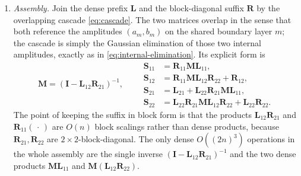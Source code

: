 \documentclass[11pt]{article}
\theoremstyle{remark}
\newcommand{\Id}{\mathbf{I}}
\begin{document}
\begin{enumerate}
\item \emph{Assembly.} Join the dense prefix $\mathbf{L}$ and the
  block-diagonal suffix $\mathbf{R}$ by the overlapping cascade
  \eqref{eq:cascade}.  The two matrices overlap in the sense that both
  reference the amplitudes $(a_m,b_m)$ on the shared boundary layer $m$;
  the cascade is simply the Gaussian elimination of those two internal
  amplitudes, exactly as in \eqref{eq:internal-elimination}.  Its explicit
  form is
  \begin{equation}
  \mathbf{M}=(\Id-\mathbf{L}_{12}\mathbf{R}_{21})^{-1},\qquad
  \begin{aligned}
  \mathbf{S}_{11}&=\mathbf{R}_{11}\mathbf{M}\mathbf{L}_{11},\\
  \mathbf{S}_{12}&=\mathbf{R}_{11}\mathbf{M}\mathbf{L}_{12}\mathbf{R}_{22}
  +\mathbf{R}_{12},\\
  \mathbf{S}_{21}&=\mathbf{L}_{21}+\mathbf{L}_{22}\mathbf{R}_{21}
  \mathbf{M}\mathbf{L}_{11},\\
  \mathbf{S}_{22}&=\mathbf{L}_{22}\mathbf{R}_{21}\mathbf{M}\mathbf{L}_{12}
  \mathbf{R}_{22}+\mathbf{L}_{22}\mathbf{R}_{22}.
  \end{aligned}
  \label{eq:cascade}
  \end{equation}
  The point of keeping the suffix in block form is that the products
  $\mathbf{L}_{12}\mathbf{R}_{21}$ and $\mathbf{R}_{11}(\,\cdot\,)$ are
  $O(n)$ block scalings rather than dense products, because
  $\mathbf{R}_{21},\mathbf{R}_{22}$ are $2\times2$-block-diagonal.  The only
  dense $O((2n)^3)$ operations in the whole assembly are the single inverse
  $(\Id-\mathbf{L}_{12}\mathbf{R}_{21})^{-1}$ and the two dense products
  $\mathbf{M}\mathbf{L}_{11}$ and $\mathbf{M}(\mathbf{L}_{12}\mathbf{R}_{22})$.
\end{enumerate}
\end{document}
